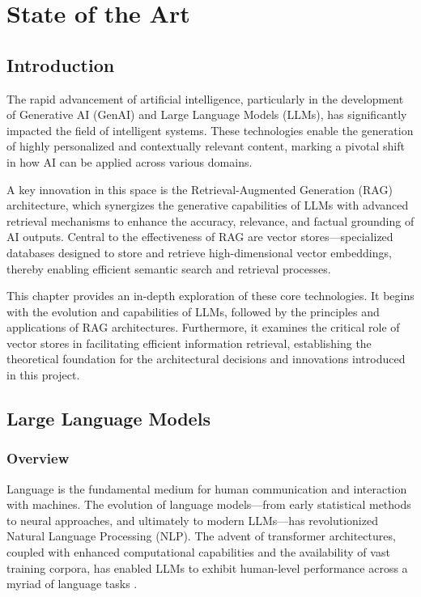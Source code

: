 
\chapter{State of the Art}

\section*{Introduction}
The rapid advancement of artificial intelligence, particularly in the development of Generative AI (GenAI) and Large Language Models (LLMs), has significantly impacted the field of intelligent systems. These technologies enable the generation of highly personalized and contextually relevant content, marking a pivotal shift in how AI can be applied across various domains. 

A key innovation in this space is the Retrieval-Augmented Generation (RAG) architecture, which synergizes the generative capabilities of LLMs with advanced retrieval mechanisms to enhance the accuracy, relevance, and factual grounding of AI outputs. Central to the effectiveness of RAG are vector stores—specialized databases designed to store and retrieve high-dimensional vector embeddings, thereby enabling efficient semantic search and retrieval processes. 

This chapter provides an in-depth exploration of these core technologies. It begins with the evolution and capabilities of LLMs, followed by the principles and applications of RAG architectures. Furthermore, it examines the critical role of vector stores in facilitating efficient information retrieval, establishing the theoretical foundation for the architectural decisions and innovations introduced in this project.

\section{Large Language Models}

\subsection{Overview}
Language is the fundamental medium for human communication and interaction with machines. The evolution of language models—from early statistical methods to neural approaches, and ultimately to modern LLMs—has revolutionized Natural Language Processing (NLP). The advent of transformer architectures, coupled with enhanced computational capabilities and the availability of vast training corpora, has enabled LLMs to exhibit human-level performance across a myriad of language tasks \cite{ref1, ref2}. 

